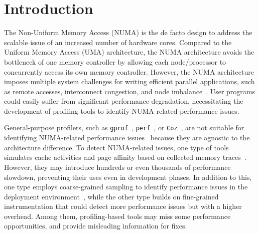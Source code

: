 \section{Introduction}
\label{sec:intro}

The Non-Uniform Memory Access (NUMA) is the de facto  design to address the scalable issue of an increased number of hardware cores. Compared to the Uniform Memory Access (UMA) architecture, the NUMA architecture avoids the bottleneck of one memory controller by allowing each node/processor to concurrently access its own memory controller. However, the NUMA architecture imposes multiple system challenges for writing efficient parallel applications, such as remote accesses, interconnect congestion, and node imbalance~\cite{Blagodurov:2011:CNC:2002181.2002182}. User programs could easily suffer from significant performance degradation, necessitating the development of profiling tools to identify NUMA-related performance issues. 

General-purpose profilers, such as \texttt{gprof}~\cite{DBLP:conf/sigplan/GrahamKM82}, \texttt{perf}~\cite{perf}, or \texttt{Coz}~\cite{Coz}, are not suitable for identifying NUMA-related performance issues~\cite{XuNuma,valat:2018:numaprof} because they are agnostic to the architecture difference. 
To detect NUMA-related issues, one type of tools
simulates cache activities and page affinity based on collected memory traces~\cite{NUMAGrind, MACPO}. However, they may introduce hundreds or even thousands of performance slowdown, preventing their uses even in development phases. In addition to this, one type employs coarse-grained sampling to identify performance issues in the deployment environment~\cite{Intel:VTune, Memphis, Lachaize:2012:MMP:2342821.2342826, XuNuma, NumaMMA, 7847070}, while the other type builds on fine-grained instrumentation that could detect more performance issues but with a higher overhead. Among them, profiling-based tools may miss some performance opportunities, and provide misleading information for fixes.  


